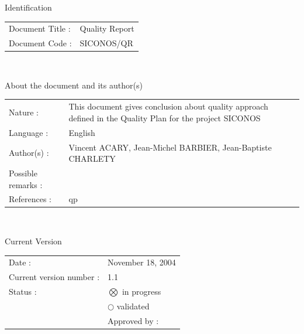 
\normalsize

\begin{center}
  \textsf{\Large Identification}
\end{center}

\noindent\begin{tabular}{|p{}|p{}|}
\hline
Document Title : & \textsf{Quality Report} \\
Document Code :  & \textsf{SICONOS/QR} \\
\hline
\end{tabular}
\textsf{ }\\


\begin{center}
  \textsf{\Large About the document and its author(s)}
\end{center}

\noindent\begin{tabular}{|p{}|p{}|}
\hline
Nature :& \textsf{This document gives conclusion about quality approach defined in the Quality Plan for the project SICONOS}\\
Language :& \textsf{English}\\
Author(s) :& \textsf{Vincent ACARY, Jean-Michel BARBIER, Jean-Baptiste CHARLETY}\\
Possible remarks :& \textsf{}\\
References : & \acs{qp}\\
\hline
\end{tabular}

\textsf{ }\\


\renewcommand{\arraystretch}{1.0}
\begin{center}
  \textsf{\Large Current Version}
\end{center}
\begin{tabular}{|p{}|p{}|}
\hline
Date : &\textsf{November 18, 2004}\\
Current version number : &\textsf{1.1}\\ 
Status :&$\bigotimes$ in progress \\
& $\bigcirc$ validated\\
\textit{ }& \hspace{0.5cm} Approved by :\\
\hline
\end{tabular}


